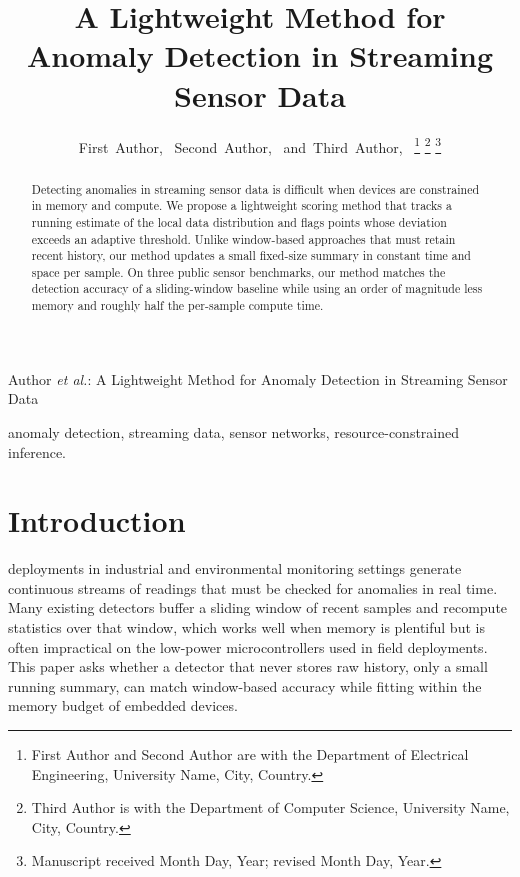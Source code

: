 \documentclass[journal]{IEEEtran}
\begin{document}
\title{A Lightweight Method for Anomaly Detection in Streaming Sensor Data}

\author{First~Author,~
        Second~Author,~
        and~Third~Author,~
\thanks{First Author and Second Author are with the Department of Electrical Engineering, University Name, City, Country.}
\thanks{Third Author is with the Department of Computer Science, University Name, City, Country.}
\thanks{Manuscript received Month Day, Year; revised Month Day, Year.}}

%
{Author \MakeLowercase{\textit{et al.}}: A Lightweight Method for Anomaly Detection in Streaming Sensor Data}

\maketitle

\begin{abstract}
Detecting anomalies in streaming sensor data is difficult when devices are constrained in memory and compute. We propose a lightweight scoring method that tracks a running estimate of the local data distribution and flags points whose deviation exceeds an adaptive threshold. Unlike window-based approaches that must retain recent history, our method updates a small fixed-size summary in constant time and space per sample. On three public sensor benchmarks, our method matches the detection accuracy of a sliding-window baseline while using an order of magnitude less memory and roughly half the per-sample compute time.
\end{abstract}

\begin{IEEEkeywords}
anomaly detection, streaming data, sensor networks, resource-constrained inference.
\end{IEEEkeywords}

\IEEEpeerreviewmaketitle

\section{Introduction}
 deployments in industrial and environmental monitoring settings generate continuous streams of readings that must be checked for anomalies in real time. Many existing detectors buffer a sliding window of recent samples and recompute statistics over that window, which works well when memory is plentiful but is often impractical on the low-power microcontrollers used in field deployments. This paper asks whether a detector that never stores raw history, only a small running summary, can match window-based accuracy while fitting within the memory budget of embedded devices.
\end{document}
